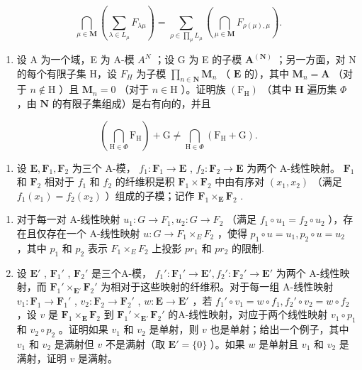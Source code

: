 \[
\bigcap_ {\mu \in \mathbf {M}} \left(\sum_ {\lambda \in L _ {\mu}} F _ {\lambda \mu}\right) = \sum_ {\rho \in \prod_ {\mu} L _ {\mu}} \left(\bigcap_ {\mu \in \mathbf {M}} F _ {\rho (\mu), \mu}\right).
\]

\begin{enumerate}
\def\labelenumi{(\alph{enumi})}
\setcounter{enumi}{1}
\tightlist
\item
  设 A 为一个域，E 为 A-模 \(A^{N}\) ；设 G 为 E 的子模 \(\mathbf{A}^{(\mathbf{N})}\) ；另一方面，对 N 的每个有限子集 H，设 \(F_{H}\) 为子模 \(\prod_{n\in \mathbf{N}}\mathbf{M}_n\) （ \(\mathbf{E}\) 的），其中 \(\mathbf{M}_n = \mathbf{A}\) （对于 \(n\notin \mathrm{H}\) ）且 \(\mathbf{M}_n = 0\) （对于 \(n\in \mathrm{H}\) ）。证明族 \((\mathrm{F_H})\) （其中 \(\mathbf{H}\) 遍历集 \(\Phi\) ，由 \(\mathbf{N}\) 的有限子集组成）是右有向的，并且
\end{enumerate}

\[
\left(\bigcap_ {\mathrm{H} \in \Phi} \mathrm{F} _ {\mathrm{H}}\right) + \mathrm{G} \neq \bigcap_ {\mathrm{H} \in \Phi} (\mathrm{F} _ {\mathrm{H}} + \mathrm{G}).
\]

\begin{enumerate}
\def\labelenumi{\arabic{enumi}.}
\setcounter{enumi}{3}
\tightlist
\item
  设 \(\mathbf{E}, \mathbf{F}_1, \mathbf{F}_2\) 为三个 A-模， \(f_1: \mathbf{F}_1 \to \mathbf{E}\) , \(f_2: \mathbf{F}_2 \to \mathbf{E}\) 为两个 A-线性映射。 \(\mathbf{F}_1\) 和 \(\mathbf{F}_2\) 相对于 \(f_1\) 和 \(f_2\) 的纤维积是积 \(\mathbf{F}_1 \times \mathbf{F}_2\) 中由有序对 \((x_1, x_2)\) （满足 \(f_1(x_1) = f_2(x_2)\) ）组成的子模；记作 \(\mathbf{F}_1 \times_{\mathbf{E}} \mathbf{F}_2\) .
\end{enumerate}

\begin{enumerate}
\def\labelenumi{(\alph{enumi})}
\item
  对于每一对 A-线性映射 \(u_1 \colon G \to F_1, u_2 \colon G \to F_2\) （满足 \(f_1 \circ u_1 = f_2 \circ u_2\) ），存在且仅存在一个 A-线性映射 \(u \colon G \to F_1 \times_E F_2\) ，使得 \(p_1 \circ u = u_1, p_2 \circ u = u_2\) ，其中 \(p_1\) 和 \(p_2\) 表示 \(F_1 \times_E F_2\) 上投影 \(pr_1\) 和 \(pr_2\) 的限制.
\item
  设 \(\mathbf{E}'\) , \(\mathbf{F}_1'\) , \(\mathbf{F}_2'\) 是三个A-模， \(f_1': \mathbf{F}_1' \to \mathbf{E}', f_2': \mathbf{F}_2' \to \mathbf{E}'\) 为两个 A-线性映射，而 \(\mathbf{F}_1' \times_{\mathbf{E}'} \mathbf{F}_2'\) 为相对于这些映射的纤维积。对于每一组 A-线性映射 \(v_1: \mathbf{F}_1 \to \mathbf{F}_1'\) , \(v_2: \mathbf{F}_2 \to \mathbf{F}_2'\) , \(w: \mathbf{E} \to \mathbf{E}'\) ，若 \(f_1' \circ v_1 = w \circ f_1, f_2' \circ v_2 = w \circ f_2\) ，设 \(v\) 是 \(\mathbf{F}_1 \times_{\mathbf{E}} \mathbf{F}_2\) 到 \(\mathbf{F}_1' \times_{\mathbf{E}'} \mathbf{F}_2'\) 的A-线性映射，对应于两个线性映射 \(v_1 \circ p_1\) 和 \(v_2 \circ p_2\) 。证明如果 \(v_1\) 和 \(v_2\) 是单射，则 \(v\) 也是单射；给出一个例子，其中 \(v_1\) 和 \(v_2\) 是满射但 \(v\) 不是满射（取 \(\mathbf{E}' = \{0\}\) ）。如果 \(w\) 是单射且 \(v_1\) 和 \(v_2\) 是满射，证明 \(v\) 是满射。
\end{enumerate}

